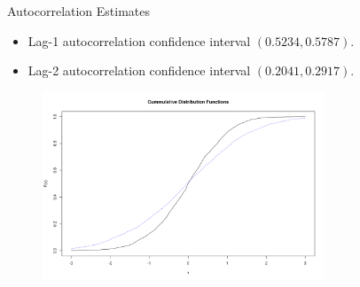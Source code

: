 \begin{frame}{Autocorrelation Estimates}
    \begin{itemize}
    \item
    Lag-1 autocorrelation confidence interval $(0.5234, 0.5787)$.

    \item
    Lag-2 autocorrelation confidence interval $(0.2041, 0.2917)$.
    \end{itemize}

    \begin{figure}
    \centering
    \includegraphics[width = 0.75\textwidth]{res/exA_cdf.png}
    \end{figure}
\end{frame}

